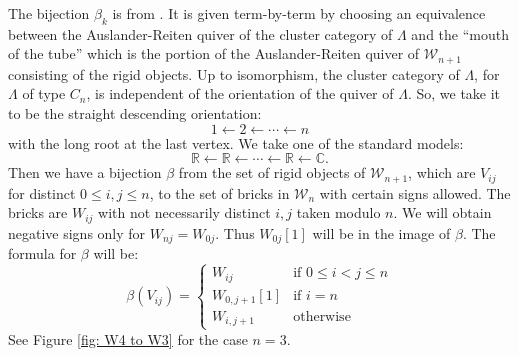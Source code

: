 \documentclass[11pt]{amsart}
\theoremstyle{definition}
\theoremstyle{remark}
\numberwithin{equation}{section}
\newcommand{\field}[1]{\mathbb{#1}}
\newcommand{\CC}{\ensuremath{{\field{C}}}}
\newcommand{\RR}{\ensuremath{{\field{R}}}}
\newcommand{\cW}{\ensuremath{{\mathcal{W}}}}
\begin{document}
The bijection $\beta_k$ is from \cite{BMV}. It is given term-by-term by choosing an equivalence between the Auslander-Reiten quiver of the cluster category of $\Lambda$ and the ``mouth of the tube'' which is the portion of the Auslander-Reiten quiver of $\cW_{n+1}$ consisting of the rigid objects. Up to isomorphism, the cluster category of $\Lambda$, for $\Lambda$ of type $C_{n}$, is independent of the orientation of the quiver of $\Lambda$. So, we take it to be the straight descending orientation:
\[
	1\leftarrow 2\leftarrow \cdots\leftarrow {n}
\]
with the long root at the last vertex. We take one of the standard models:
\[
	\RR\leftarrow \RR\leftarrow \cdots\leftarrow\RR\leftarrow \CC.
\]
Then we have a bijection $\beta$ from the set of rigid objects of $\cW_{n+1}$, which are $V_{ij}$ for distinct $0\le i,j \le n$, to the set of bricks in $\cW_n$ with certain signs allowed. The bricks are $W_{ij}$ with not necessarily distinct $ i,j$ taken modulo $n$. We will obtain negative signs only for $W_{nj}=W_{0j}$. Thus $W_{0j}[1]$ will be in the image of $\beta$. The formula for $\beta$ will be:
\[
	\beta(V_{ij})=\begin{cases} W_{ij} & \text{if } 0\le i<j\le n\\
   W_{0,j+1}[1] & \text{if } i=n\\
   W_{i,j+1} & \text{otherwise}
    \end{cases}
\]
See Figure \ref{fig: W4 to W3} for the case $n=3$.
\end{document}
